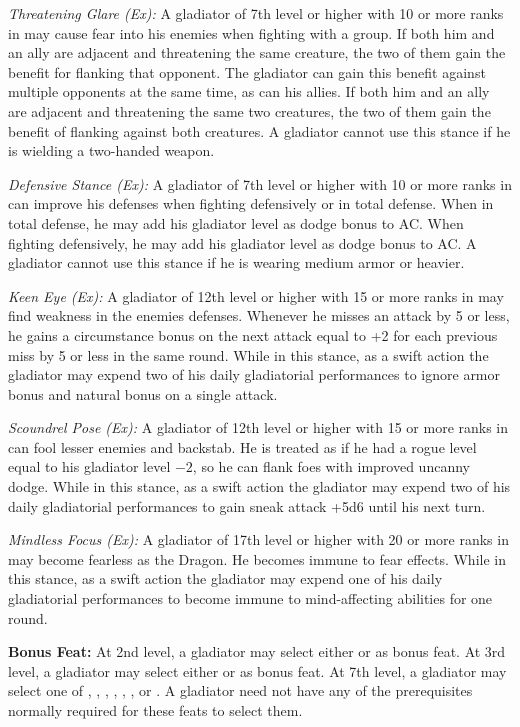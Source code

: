 \textit{Threatening Glare (Ex):} A gladiator of 7th level or higher with 10 or more ranks in  may cause fear into his enemies when fighting with a group. If both him and an ally are adjacent and threatening the same creature, the two of them gain the benefit for flanking that opponent. The gladiator can gain this benefit against multiple opponents at the same time, as can his allies. If both him and an ally are adjacent and threatening the same two creatures, the two of them gain the benefit of flanking against both creatures. A gladiator cannot use this stance if he is wielding a two-handed weapon.

\textit{Defensive Stance (Ex):} A gladiator of 7th level or higher with 10 or more ranks in  can improve his defenses when fighting defensively or in total defense. When in total defense, he may add \onehalf his gladiator level as dodge bonus to AC. When fighting defensively, he may add \onequarter his gladiator level as dodge bonus to AC. A gladiator cannot use this stance if he is wearing medium armor or heavier.

\textit{Keen Eye (Ex):} A gladiator of 12th level or higher with 15 or more ranks in  may find weakness in the enemies defenses. Whenever he misses an attack by 5 or less, he gains a circumstance bonus on the next attack equal to +2 for each previous miss by 5 or less in the same round. While in this stance, as a swift action the gladiator may expend two of his daily gladiatorial performances to ignore armor bonus and natural bonus on a single attack. 

\textit{Scoundrel Pose (Ex):} A gladiator of 12th level or higher with 15 or more ranks in  can fool lesser enemies and backstab. He is treated as if he had a rogue level equal to his gladiator level $-2$, so he can flank foes with improved uncanny dodge. While in this stance, as a swift action the gladiator may expend two of his daily gladiatorial performances to gain sneak attack +5d6 until his next turn.

\textit{Mindless Focus (Ex):} A gladiator of 17th level or higher with 20 or more ranks in  may become fearless as the Dragon. He becomes immune to fear effects. While in this stance, as a swift action the gladiator may expend one of his daily gladiatorial performances to become immune to mind-affecting abilities for one round.

\textbf{Bonus Feat:} At 2nd level, a gladiator may select either  or  as bonus feat. At 3rd level, a gladiator may select either  or  as bonus feat. At 7th level, a gladiator may select one of , , , , , , or . A gladiator need not have any of the prerequisites normally required for these feats to select them.

